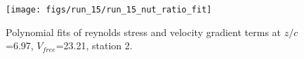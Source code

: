 \begin{figure}[H]
\centering
\texttt{[image: figs/run\_15/run\_15\_nut\_ratio\_fit]}
\caption{Polynomial fits of reynolds stress and velocity gradient terms at $z/c$=6.97, $V_{free}$=23.21, station 2.}
\label{fig:run_15_nut_ratio_fit}
\end{figure}



